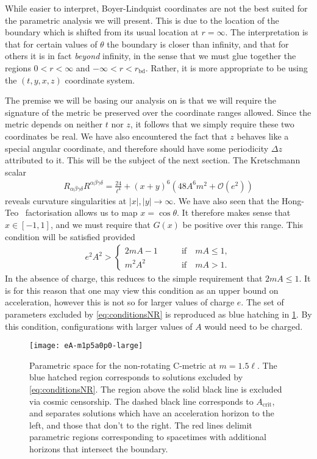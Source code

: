 \documentclass[
twoside,
openright,
frontopenright,
]{dmathesis}
\begin{document}
While easier to interpret, Boyer-Lindquist coordinates are not the best suited
for the parametric analysis we will present. This is due to the location of the
boundary which is shifted from its usual location at $r=\infty$. The
interpretation is that for certain values of $\theta$ the boundary is closer
than infinity, and that for others it is in fact \emph{beyond} infinity, in the
sense that we must glue together the regions $0<r<\infty$ and
$-\infty < r < r_\mathrm{bd}$. Rather, it is more appropriate to be using the
$(t,y,x,z)$ coordinate system.

The premise we will be basing our analysis on is that we will require the
signature of the metric be preserved over the coordinate ranges allowed. Since
the metric depends on neither $t$ nor $z$, it follows that we simply require
these two coordinates be real. We have also encountered the fact that $z$
behaves like a special angular coordinate, and therefore should have some
periodicity $\Delta z$ attributed to it. This will be the subject of the next
section. The Kretschmann scalar
\begin{align}
  R_{\alpha\beta\gamma\delta}R^{\alpha\beta\gamma\delta} = \frac{24}{\ell^4} +
  (x+y)^6\left(48A^6m^2+\mathcal{O}(e^2)\right)
\end{align}
reveals curvature singularities at $|x|,|y|\to\infty$. We have also seen that
the Hong-Teo~\cite{Hong:2003gx} factorisation allows us to map
$x=\cos\theta$. It therefore makes sense that $x \in [-1,1]$, and we must
require that $G(x)$ be positive over this range. This condition will be
satisfied provided
\begin{align}
  \label{eq:conditionsNR}
  e^2A^2 >
  \begin{cases}
    2mA - 1 \qquad &\mbox{if} \quad mA \leqslant 1,\\
    m^2A^2 \qquad &\mbox{if} \quad mA > 1.
  \end{cases}
\end{align}
In the absence of charge, this reduces to the simple requirement that
$2mA\leqslant 1$. It is for this reason that one may view this condition as an
upper bound on acceleration, however this is not so for larger values of charge
$e$. The set of parameters excluded by \cref{eq:conditionsNR} is reproduced as
blue hatching in \cref{fig:param-regionsNR}. By this condition, configurations
with larger values of $A$ would need to be charged.

\begin{figure}
  \centering
  \texttt{[image: eA-m1p5a0p0-large]}
  \caption{\label{fig:param-regionsNR}Parametric space for the non-rotating C-metric
    at $m=1.5\ell$. The blue hatched region corresponds to solutions excluded by
    \cref{eq:conditionsNR}. The region above the solid black line is excluded
    via cosmic censorship. The dashed black line corresponds to
    $A_\mathrm{crit}$, and separates solutions which have an acceleration
    horizon to the left, and those that don't to the right. The red lines
    delimit parametric regions corresponding to spacetimes with additional
    horizons that intersect the boundary.}
\end{figure}
\end{document}
